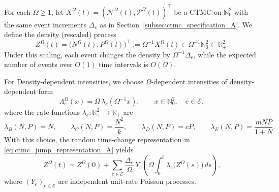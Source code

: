 \documentclass[pdflatex,sn-mathphys-ay]{sn-jnl}
\theoremstyle{thmstyleone}
\theoremstyle{definition}
\theoremstyle{remark}
\begin{document}

For each $\Omega\ge 1$, let $X^\Omega(t)=(\mathcal N^\Omega(t),\mathcal P^\Omega(t))^\top$ be a CTMC on
$\mathbb{N}_0^2$ with the same event increments $\Delta_e$ as in Section~\ref{subsec:ctmc_specification_A}.
We define the density (rescaled) process
\begin{equation}\label{eq:density_definition_A}
Z^\Omega(t)=\bigl(N^\Omega(t),P^\Omega(t)\bigr)^\top
:=\Omega^{-1}X^\Omega(t)\in \Omega^{-1}\mathbb{N}_0^2\subset\mathbb{R}_+^2.
\end{equation}
Under this scaling, each event changes the density by $\Omega^{-1}\Delta_e$, while the expected number of events over
$O(1)$ time intervals is $O(\Omega)$.

For Density-dependent intensities, we choose $\Omega$-dependent intensities of density-dependent form
\begin{equation}\label{eq:intensities_scaled_A}
\Lambda_e^\Omega(x)=\Omega\,\lambda_e(\Omega^{-1}x),
\qquad x\in\mathbb{N}_0^2,\quad e\in\mathcal E,
\end{equation}
where the rate functions $\lambda_e:\mathbb{R}_+^2\to\mathbb{R}_+$ are
\begin{equation}\label{eq:rate_functions_A}
\lambda_B(N,P)=N,\qquad
\lambda_C(N,P)=\frac{N^2}{k},\qquad
\lambda_D(N,P)=cP,\qquad
\lambda_E(N,P)=\frac{mNP}{1+N}.
\end{equation}
With this choice, the random time-change representation in \eqref{eq:ctmc_jump_representation_A} yields
\begin{equation}\label{eq:density_jump_representation_A}
Z^\Omega(t)=Z^\Omega(0)+\sum_{e\in\mathcal E}\frac{\Delta_e}{\Omega}\,
Y_e\!\left(\Omega\int_0^t \lambda_e\bigl(Z^\Omega(s)\bigr)\,ds\right),
\end{equation}
where $(Y_e)_{e\in\mathcal E}$ are independent unit-rate Poisson processes.
\end{document}
